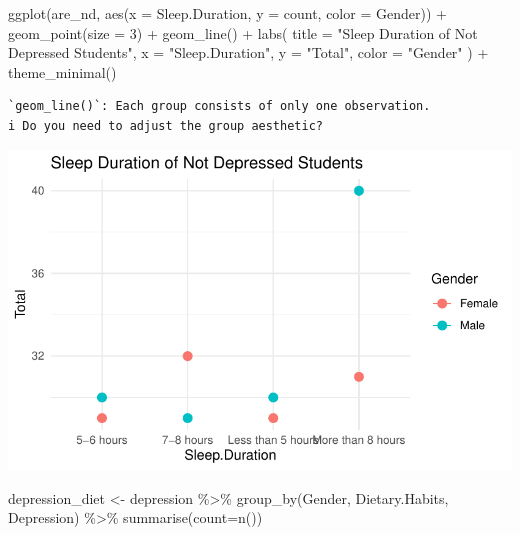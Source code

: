 \documentclass[
  letterpaper,
  DIV=11,
  numbers=noendperiod]{scrartcl}
\newenvironment{Shaded}{\begin{snugshade}}{\end{snugshade}}
\newcommand{\AttributeTok}[1]{\textcolor[rgb]{0.40,0.45,0.13}{#1}}
\newcommand{\DecValTok}[1]{\textcolor[rgb]{0.68,0.00,0.00}{#1}}
\newcommand{\FunctionTok}[1]{\textcolor[rgb]{0.28,0.35,0.67}{#1}}
\newcommand{\NormalTok}[1]{\textcolor[rgb]{0.00,0.23,0.31}{#1}}
\newcommand{\OtherTok}[1]{\textcolor[rgb]{0.00,0.23,0.31}{#1}}
\newcommand{\SpecialCharTok}[1]{\textcolor[rgb]{0.37,0.37,0.37}{#1}}
\newcommand{\StringTok}[1]{\textcolor[rgb]{0.13,0.47,0.30}{#1}}
\begin{document}
\begin{Shaded}
\begin{Highlighting}[]
\FunctionTok{ggplot}\NormalTok{(are\_nd, }\FunctionTok{aes}\NormalTok{(}\AttributeTok{x =}\NormalTok{ Sleep.Duration, }\AttributeTok{y =}\NormalTok{ count, }\AttributeTok{color =}\NormalTok{ Gender)) }\SpecialCharTok{+}
  \FunctionTok{geom\_point}\NormalTok{(}\AttributeTok{size =} \DecValTok{3}\NormalTok{) }\SpecialCharTok{+}    
  \FunctionTok{geom\_line}\NormalTok{() }\SpecialCharTok{+}       
  \FunctionTok{labs}\NormalTok{(}
    \AttributeTok{title =} \StringTok{"Sleep Duration of Not Depressed Students"}\NormalTok{,}
    \AttributeTok{x =} \StringTok{"Sleep.Duration"}\NormalTok{,}
    \AttributeTok{y =} \StringTok{"Total"}\NormalTok{,}
    \AttributeTok{color =} \StringTok{"Gender"}
\NormalTok{  ) }\SpecialCharTok{+}
  \FunctionTok{theme\_minimal}\NormalTok{() }
\end{Highlighting}
\end{Shaded}

\begin{verbatim}
`geom_line()`: Each group consists of only one observation.
i Do you need to adjust the group aesthetic?
\end{verbatim}

\includegraphics{Data_files/figure-pdf/unnamed-chunk-6-2.pdf}

\begin{Shaded}
\begin{Highlighting}[]
\NormalTok{depression\_diet }\OtherTok{\textless{}{-}}\NormalTok{ depression }\SpecialCharTok{\%\textgreater{}\%} \FunctionTok{group\_by}\NormalTok{(Gender, Dietary.Habits, Depression) }\SpecialCharTok{\%\textgreater{}\%} \FunctionTok{summarise}\NormalTok{(}\AttributeTok{count=}\FunctionTok{n}\NormalTok{())}
\end{Highlighting}
\end{Shaded}
\end{document}
